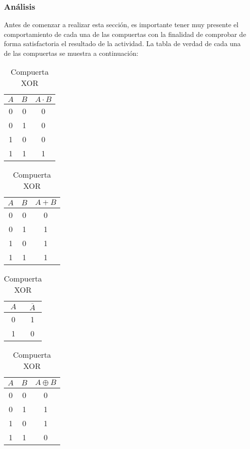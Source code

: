 \documentclass[../procedimientos.tex]{subfiles}
\begin{document}
\subsubsection{Análisis}
Antes de comenzar a realizar esta sección, es importante tener muy presente el 
comportamiento de cada una de las compuertas con la finalidad de comprobar de 
forma satisfactoria el resultado de la actividad. La tabla de verdad de cada 
una de las compuertas se muestra a continuación:
\begin{table}[h!]
  \caption{Tablas de verdad (Sección A)}
  \label{tab:a_tv}
  \centering
  \begin{subtable}[t]{0.25\linewidth} %
    \centering
    \label{tab:comp_and}
    \begin{tabular}{|c c|c|}
      \hline
      $A$ & $B$ & $A \cdot B$\\
      \hline
      0 & 0 & 0\\
      0 & 1 & 0\\
      1 & 0 & 0\\
      1 & 1 & 1\\
      \hline
    \end{tabular}
    \caption{Compuerta AND}
  \end{subtable}
  \begin{subtable}[t]{0.25\linewidth} %
    \centering
    \label{tab:comp_or}
    \begin{tabular}{|c c|c|}
      \hline
      $A$ & $B$ & $A + B$\\
      \hline
      0 & 0 & 0\\
      0 & 1 & 1\\
      1 & 0 & 1\\
      1 & 1 & 1\\
      \hline
    \end{tabular}
    \caption{Compuerta OR}
  \end{subtable}
  \begin{subtable}[t]{0.20\linewidth} %
    \centering
    \label{tab:comp_not}
    \begin{tabular}{|c|c|}
      \hline
      $A$ & $\overline{A}$\\
      \hline
      0 & 1\\
      1 & 0\\
      \hline
    \end{tabular}
    \caption{Compuerta NOT}
  \end{subtable}
  \begin{subtable}[t]{0.25\linewidth} %
    \centering
    \label{tab:comp_xor}
    \begin{tabular}{|c c|c|}
      \hline
      $A$ & $B$ & $A \oplus B$\\
      \hline
      0 & 0 & 0\\
      0 & 1 & 1\\
      1 & 0 & 1\\
      1 & 1 & 0\\
      \hline
    \end{tabular}
    \caption{Compuerta XOR}
  \end{subtable}
\end{table}
\end{document}
